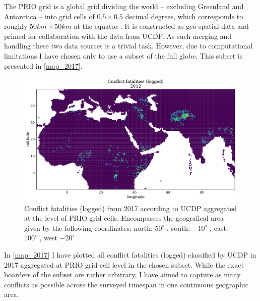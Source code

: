 \documentclass[a4paper]{article}
\begin{document}
The PRIO grid is a global grid dividing the world -- excluding Greenland and Antarctica -- into grid cells of $0.5 \times 0.5$ decimal degrees, which corresponds to roughly $50km\times50km$ at the equator \citep[367]{Tollefsen_2012}. It is constructed as geo-spatial data and primed for collaboration with the data from UCDP. As such merging and handling these two data sources is a trivial task. However, due to computational limitations I have chosen only to use a subset of the full globe. This subset is presented in \autoref{map_2017}.\par

\begin{figure}[!htb]
	\centering
	\includegraphics[scale=0.5]{log_best_2012_samples.pdf}
    \caption{\footnotesize{Conflict fatalities (logged) from 2017 according to UCDP aggregated at the level of PRIO grid cells. Encompasses the geografical area given by the following coordinates; north: $50^{\circ}$ , south: $-10^{\circ}$ , east: $100^{\circ}$ , west $-20^{\circ}$}}\label{map_2017}
\end{figure}

In \autoref{map_2017} I have plotted all conflict fatalities (logged) classified by UCDP in 2017 aggregated at PRIO grid cell level in the chosen subset. While the exact boarders of the subset are rather arbitrary, I have aimed to capture as many conflicts as possible across the surveyed timespan in one continuous geographic area.\par

\end{document}
